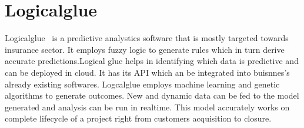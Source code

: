 \section{Logicalglue}

Logicalglue~\cite{hid-sp18-413-logicalglue} is a predictive analystics software
that is mostly targeted towards insurance sector. It employs fuzzy logic to
generate rules which in turn derive accurate predictions.Logical glue helps in
identifying which data is predictive and can be deployed in cloud. It has its
API which an be integrated into buisnnes's already existing
softwares. Logcalglue employs machine learning and genetic algorithms to
generate outcomes. New and dynamic data can be fed to the model generated and
analysis can be run in realtime. This model accurately works on complete
lifecycle of a project right from customers acquisition to closure.
